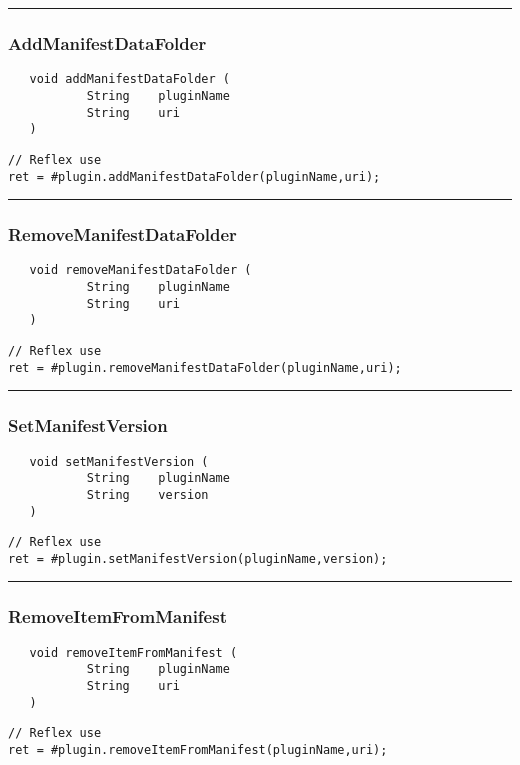 \rule{15cm}{2pt}
\subsubsection{AddManifestDataFolder}
\label{Api:AddManifestDataFolder}
\begin{verbatim}
   void addManifestDataFolder (
           String    pluginName
           String    uri
   )
\end{verbatim}
\begin{lstlisting}[language=reflex]
// Reflex use
ret = #plugin.addManifestDataFolder(pluginName,uri);
\end{lstlisting}



\rule{15cm}{2pt}
\subsubsection{RemoveManifestDataFolder}
\label{Api:RemoveManifestDataFolder}
\begin{verbatim}
   void removeManifestDataFolder (
           String    pluginName
           String    uri
   )
\end{verbatim}
\begin{lstlisting}[language=reflex]
// Reflex use
ret = #plugin.removeManifestDataFolder(pluginName,uri);
\end{lstlisting}



\rule{15cm}{2pt}
\subsubsection{SetManifestVersion}
\label{Api:SetManifestVersion}
\begin{verbatim}
   void setManifestVersion (
           String    pluginName
           String    version
   )
\end{verbatim}
\begin{lstlisting}[language=reflex]
// Reflex use
ret = #plugin.setManifestVersion(pluginName,version);
\end{lstlisting}



\rule{15cm}{2pt}
\subsubsection{RemoveItemFromManifest}
\label{Api:RemoveItemFromManifest}
\begin{verbatim}
   void removeItemFromManifest (
           String    pluginName
           String    uri
   )
\end{verbatim}
\begin{lstlisting}[language=reflex]
// Reflex use
ret = #plugin.removeItemFromManifest(pluginName,uri);
\end{lstlisting}



